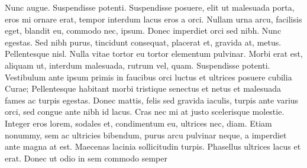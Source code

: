 \documentclass{article}
\begin{document}
Nunc augue. Suspendisse potenti. Suspendisse posuere, elit ut malesuada porta,
eros mi ornare erat, tempor interdum lacus eros a orci. Nullam urna arcu,
facilisis eget, blandit eu, commodo nec, ipsum. Donec imperdiet orci sed nibh.
Nunc egestas. Sed nibh purus, tincidunt consequat, placerat et, gravida at,
metus. Pellentesque nisl. Nulla vitae tortor eu tortor elementum pulvinar. Morbi
erat est, aliquam ut, interdum malesuada, rutrum vel, quam. Suspendisse potenti.
Vestibulum ante ipsum primis in faucibus orci luctus et ultrices posuere cubilia
Curae; Pellentesque habitant morbi tristique senectus et netus et malesuada
fames ac turpis egestas. Donec mattis, felis sed gravida iaculis, turpis ante
varius orci, sed congue ante nibh id lacus. Cras nec mi at justo scelerisque
molestie. Integer eros lorem, sodales et, condimentum eu, ultrices nec, diam.
Etiam nonummy, sem ac ultricies bibendum, purus arcu pulvinar neque, a imperdiet
ante magna at est. Maecenas lacinia sollicitudin turpis. Phasellus ultrices
lacus et erat. Donec ut odio in sem commodo semper

\theendnotes
\end{document}
